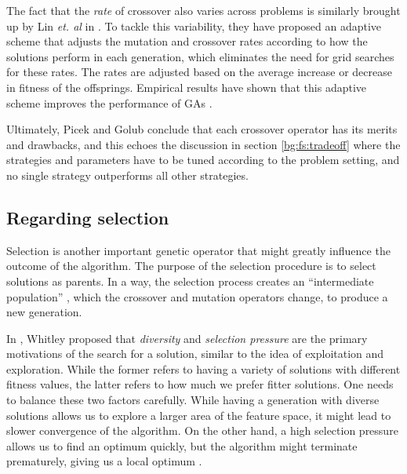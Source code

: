 \documentclass[12pt, twoside, a4paper]{report}
\begin{document}
The fact that the \textit{rate} of crossover also varies across problems is similarly brought up by Lin \textit{et. al} in \cite{RefWorks:225}. To tackle this variability, they have proposed an adaptive scheme that adjusts the mutation and crossover rates according to how the solutions perform in each generation, which eliminates the need for grid searches for these rates. The rates are adjusted based on the average increase or decrease in fitness of the offsprings. Empirical results have shown that this adaptive scheme improves the performance of GAs \cite{RefWorks:225, RefWorks:226}.

Ultimately, Picek and Golub conclude that each crossover operator has its merits and drawbacks, and this echoes the discussion in section \ref{bg:fs:tradeoff} where the strategies and parameters have to be tuned according to the problem setting, and no single strategy outperforms all other strategies.





\subsection{Regarding selection} \label{bg:ga:selection}
Selection is another important genetic operator that might greatly influence the outcome of the algorithm. The purpose of the selection procedure is to select solutions as parents. In a way, the selection process creates an ``intermediate population'' \cite{RefWorks:240}, which the crossover and mutation operators change, to produce a new generation.

In \cite{RefWorks:241}, Whitley proposed that \textit{diversity} and \textit{selection pressure} are the primary motivations of the search for a solution, similar to the idea of exploitation and exploration. While the former refers to having a variety of solutions with different fitness values, the latter refers to how much we prefer fitter solutions. One needs to balance these two factors carefully. While having a generation with diverse solutions allows us to explore a larger area of the feature space, it might lead to slower convergence of the algorithm. On the other hand, a high selection pressure allows us to find an optimum quickly, but the algorithm might terminate prematurely, giving us a local optimum \cite{RefWorks:242}.
\end{document}
